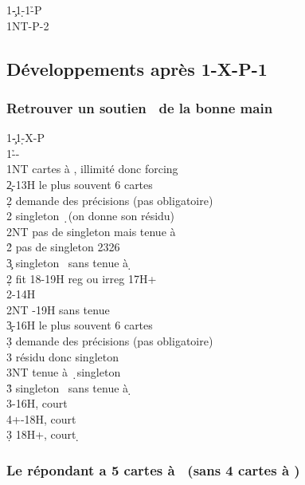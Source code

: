 \documentclass[a4paper]{article}
\begin{document}
\begin{bidtable}
1\c-1\d-1\h-P\\
1NT-P-2\s
\end{bidtable}

\subsection{Développements après 1\pdfd-X-P-1\pdfh}

\subsubsection{Retrouver un soutien \pdfs\ de la bonne main}

\begin{bidtable}
1\c-1\d-X-P\\
1\h--\\
1NT  cartes à \s , illimité donc forcing\+\\
2\c {}-13H le plus souvent 6 cartes\+\\
2\d \> demande des précisions (pas obligatoire)\+\\
2\s \> singleton \d\ (on donne son résidu)\\
2NT \> pas de singleton mais tenue à \d \\
2\h \> pas de singleton 2326\\
3\c \> singleton \s\ sans tenue à \d \-\-\\
2\d \> fit 18-19H reg ou irreg 17H+\\
2\s {}-14H\\
2NT -19H sans tenue\\
3\c {}-16H le plus souvent 6 cartes\+\\
3\d \> demande des précisions (pas obligatoire)\+\\
3\s \> résidu donc singleton \d \\
3NT \> tenue à \d\ singleton \s \\
3\h \> singleton \s\ sans tenue à \d \-\-\\
3\s {}-16H, court \d \\
4\s {}+-18H, court \d \\
3\d \> 18H+, court \d \-
\end{bidtable}

\subsubsection{Le répondant a 5 cartes à \pdfh\ (sans 4 cartes à \pdfs)}
\end{document}
